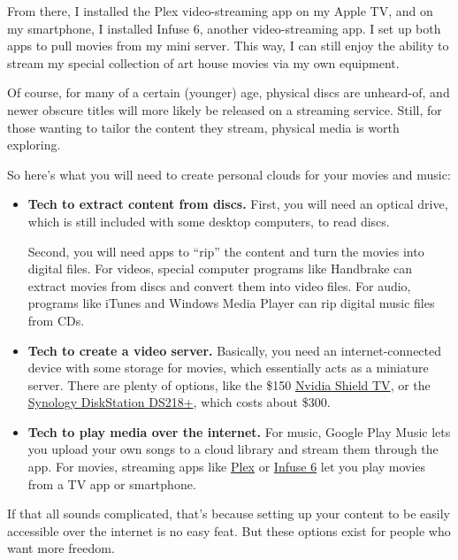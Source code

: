 From there, I installed the Plex video-streaming app on my Apple TV, and
on my smartphone, I installed Infuse 6, another video-streaming app. I
set up both apps to pull movies from my mini server. This way, I can
still enjoy the ability to stream my special collection of art house
movies via my own equipment.

Of course, for many of a certain (younger) age, physical discs are
unheard-of, and newer obscure titles will more likely be released on a
streaming service. Still, for those wanting to tailor the content they
stream, physical media is worth exploring.

So here's what you will need to create personal clouds for your movies
and music:

\begin{itemize}
\item
  \textbf{Tech to extract content from discs.} First, you will need an
  optical drive, which is still included with some desktop computers, to
  read discs.

  Second, you will need apps to ``rip'' the content and turn the movies
  into digital files. For videos, special computer programs like
  Handbrake can extract movies from discs and convert them into video
  files. For audio, programs like iTunes and Windows Media Player can
  rip digital music files from CDs.
\item
  \textbf{Tech to create a video server.} Basically, you need an
  internet-connected device with some storage for movies, which
  essentially acts as a miniature server. There are plenty of options,
  like the \$150 \href{https://www.nvidia.com/en-us/shield/shop/}{Nvidia
  Shield TV}, or the
  \href{https://www.synology.com/en-us/products/DS218+}{Synology
  DiskStation DS218+}, which costs about \$300.
\end{itemize}

\begin{itemize}
\tightlist
\item
  \textbf{Tech to play media over the internet.} For music, Google Play
  Music lets you upload your own songs to a cloud library and stream
  them through the app. For movies, streaming apps like
  \href{https://www.plex.tv/}{Plex} or
  \href{https://apps.apple.com/us/app/infuse-6/id1136220934}{Infuse 6}
  let you play movies from a TV app or smartphone.
\end{itemize}

If that all sounds complicated, that's because setting up your content
to be easily accessible over the internet is no easy feat. But these
options exist for people who want more freedom.

